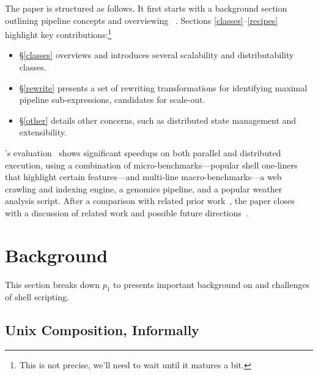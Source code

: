 \documentclass[sigplan,10pt,review,anonymous]{acmart}
\begin{document}
The paper is structured as follows.
It first starts with a background section outlining pipeline concepts and overviewing \sys~.
Sections \ref{classes}--\ref{recipes} highlight key contributions:\footnote{
  This is not precise, we'll need to wait until it matures a bit.
}
\begin{itemize}

  \item
  \S\ref{classes} overviews \sys and introduces several scalability and distributability classes.

  \item
  \S\ref{rewrite} presents a set of rewriting transformations for identifying maximal pipeline sub-expressions, candidates for scale-out.

  \item
  \S\ref{other} details other concerns, such as distributed state management and extensibility.
\end{itemize}

\noindent
\sys's evaluation~ shows significant speedups on both parallel and distributed execution, using a combination of micro-bench\-marks---popular shell one-liners that highlight certain features---and multi-line macro-benchmarks---a web crawling and indexing engine, a genomics pipeline, and a popular weather analysis script.
After a comparison with related prior work~, the paper closes with a discussion of related work and possible future directions~.

% 

\section{Background}
\label{bg}

This section breaks down $p_1$ to presents important background on and challenges
of shell scripting.

\subsection{Unix Composition, Informally}
\label{bg:pipelines}
\end{document}
